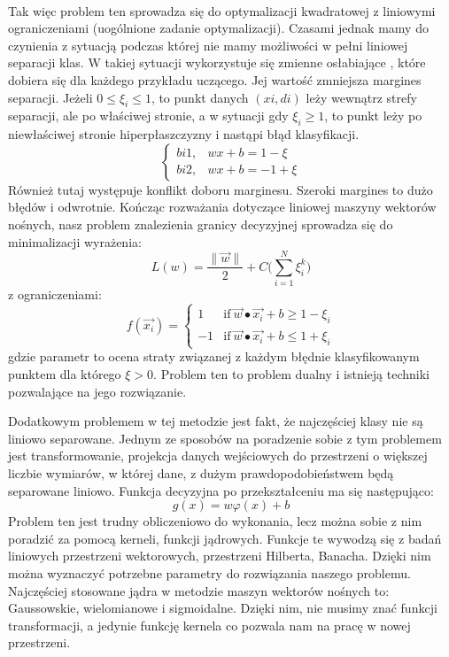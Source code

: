 \\
Tak więc problem ten sprowadza się do optymalizacji kwadratowej z liniowymi ograniczeniami (uogólnione zadanie optymalizacji). 
Czasami jednak mamy do czynienia z sytuacją podczas której nie mamy możliwości w pełni liniowej separacji klas. W takiej sytuacji wykorzystuje się zmienne osłabiające , które dobiera się dla każdego przykładu uczącego. Jej wartość zmniejsza margines separacji. Jeżeli $0 \le \xi_{i} \le 1$, to punkt danych $(xi,di)$ leży wewnątrz strefy separacji, ale po właściwej stronie, a w sytuacji gdy $\xi_{i} \ge 1$, to punkt leży po niewłaściwej stronie hiperpłaszczyzny i nastąpi błąd klasyfikacji. 
\[
    \begin{cases}
            bi1,&  wx+b = 1 - \xi\\
            bi2,& wx+b= -1 + \xi
    \end{cases}
\]
Również tutaj występuje konflikt doboru marginesu. Szeroki margines to dużo błędów i odwrotnie. Kończąc rozważania dotyczące liniowej maszyny wektorów nośnych, nasz problem znalezienia granicy decyzyjnej sprowadza się do minimalizacji wyrażenia:
\[
L(w) = \frac{\|\vec{w}\|}{2} + C\big(\sum_{i=1}^{N}\xi_{i}^{k}\big)
\]
z ograniczeniami:
\[
f(\vec{x_{i}}) = 
    \begin{cases}
            1 &  \text{if}\ \vec{w} \bullet \vec{x_{i}}+b \ge 1 - \xi_{i}\\
            -1 &  \text{if}\ \vec{w} \bullet \vec{x_{i}}+b \le 1 + \xi_{i}
    \end{cases}
\]
gdzie parametr  to ocena straty związanej z każdym błędnie klasyfikowanym punktem dla którego $\xi > 0$. Problem ten to problem dualny i istnieją techniki pozwalające na jego rozwiązanie.

Dodatkowym problemem w tej metodzie jest fakt, że najczęściej klasy nie są liniowo separowane. Jednym ze sposobów na poradzenie sobie z tym problemem jest transformowanie, projekcja danych wejściowych do przestrzeni o większej liczbie wymiarów, w której dane, z dużym prawdopodobieństwem będą separowane liniowo. Funkcja decyzyjna po przekształceniu ma się następująco:
\[
g(x) = w\varphi(x) + b
\]
Problem ten jest trudny obliczeniowo do wykonania, lecz można sobie z nim poradzić za pomocą kerneli, funkcji jądrowych. Funkcje te wywodzą się z badań liniowych przestrzeni wektorowych, przestrzeni Hilberta, Banacha. Dzięki nim można wyznaczyć potrzebne parametry do rozwiązania naszego problemu. Najczęściej stosowane jądra w metodzie maszyn wektorów nośnych to: Gaussowskie, wielomianowe i sigmoidalne. Dzięki nim, nie musimy znać funkcji transformacji, a jedynie funkcję kernela co pozwala nam na pracę w nowej przestrzeni. 

